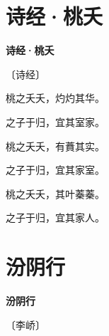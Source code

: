 \documentclass[12pt,UTF-8,openany,fontset=none]{ctexbook}
\begin{document}
\vspace{8pt}
\clearpage

\section{诗经·桃夭}


\begin{center}
    {\bfseries 诗经·桃夭}

    \vspace{18pt}

    \begin{large}\xuwen
        〔诗经〕
    \end{large}

\end{center}

    \vspace{18pt}  %

\begin{center}
    \begin{Large}

        桃之夭夭，灼灼其华。

        之子于归，宜其室家。

        \vspace{18pt}  %

        桃之夭夭，有蕡其实。

        之子于归，宜其家室。

        \vspace{18pt}  %

        桃之夭夭，其叶蓁蓁。

        之子于归，宜其家人。

    \end{Large}

\end{center}

\vspace{8pt}
\clearpage

\section{汾阴行}


\begin{center}
    {\bfseries 汾阴行}

    \vspace{18pt}

    \begin{large}\xuwen
        〔李峤〕
    \end{large}

\end{center}
\end{document}
